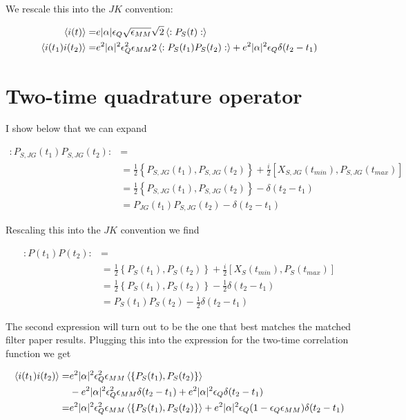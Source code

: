 \documentclass[12pt]{article}
\begin{document}
We rescale this into the $JK$ convention:

\begin{align}
\braket{i(t)} = &e |\alpha|\epsilon_Q  \sqrt{\epsilon_{MM}}\sqrt{2}\Braket{:P_{S}(t):}\\
\braket{i(t_1)i(t_2)} = &e^2|\alpha|^2\epsilon_Q^2\epsilon_{MM}2\Braket{:P_{S}(t_1)P_{S}(t_2):} + e^2|\alpha|^2\epsilon_Q\delta(t_2-t_1)
\end{align}

\section{Two-time quadrature operator}

I show below that we can expand

\begin{align}
:P_{S,JG}(t_1)P_{S,JG}(t_2): &= \\
&= \frac{1}{2}\left\{P_{S,JG}(t_1), P_{S,JG}(t_2)\right\} + \frac{i}{2}\left[X_{S,JG}(t_{min}), P_{S,JG}(t_{max})\right]\\
&= \frac{1}{2}\left\{P_{S,JG}(t_1), P_{S,JG}(t_2)\right\} - \delta(t_2-t_1)\\
&= P_{JG}(t_1)P_{S,JG}(t_2) - \delta(t_2-t_1)
\end{align}

Rescaling this into the $JK$ convention we find

\begin{align}
:P(t_1)P(t_2): &= \\
&= \frac{1}{2}\left\{P_S(t_1), P_S(t_2)\right\} + \frac{i}{2}\left[X_S(t_{min}), P_S(t_{max})\right]\\
&= \frac{1}{2}\left\{P_S(t_1), P_S(t_2)\right\} - \frac{1}{2}\delta(t_2-t_1)\\
&= P_S(t_1)P_S(t_2) - \frac{1}{2}\delta(t_2-t_1)
\end{align}

The second expression will turn out to be the one that best matches the matched filter paper results. Plugging this into the expression for the two-time correlation function we get

\begin{align}
\Braket{i(t_1)i(t_2)} =& e^2 |\alpha|^2 \epsilon_Q^2 \epsilon_{MM} \Braket{\left\{P_S(t_1), P_S(t_2)\right\}}\\
&- e^2|\alpha|^2\epsilon_Q^2\epsilon_{MM}\delta(t_2-t_1) + e^2|\alpha|^2\epsilon_Q\delta(t_2-t_1)\\
=& e^2 |\alpha|^2 \epsilon_Q^2 \epsilon_{MM} \Braket{\left\{P_S(t_1), P_S(t_2)\right\}} + e^2|\alpha|^2 \epsilon_Q(1-\epsilon_Q\epsilon_{MM})\delta(t_2-t_1)
\end{align}
\end{document}
